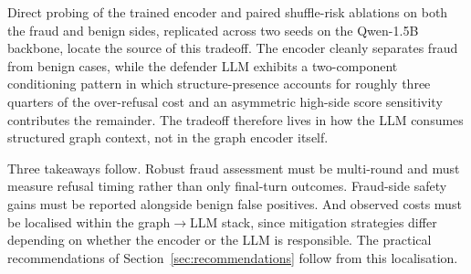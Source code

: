 \documentclass[10pt,letterpaper]{article}
\begin{document}
Direct probing of the trained encoder and paired shuffle-risk ablations on both the fraud and benign sides, replicated across two seeds on the Qwen-1.5B backbone, locate the source of this tradeoff. The encoder cleanly separates fraud from benign cases, while the defender LLM exhibits a two-component conditioning pattern in which structure-presence accounts for roughly three quarters of the over-refusal cost and an asymmetric high-side score sensitivity contributes the remainder. The tradeoff therefore lives in how the LLM consumes structured graph context, not in the graph encoder itself.

Three takeaways follow. Robust fraud assessment must be multi-round and must measure refusal timing rather than only final-turn outcomes. Fraud-side safety gains must be reported alongside benign false positives. And observed costs must be localised within the graph$\to$LLM stack, since mitigation strategies differ depending on whether the encoder or the LLM is responsible. The practical recommendations of Section~\ref{sec:recommendations} follow from this localisation.
\end{document}
